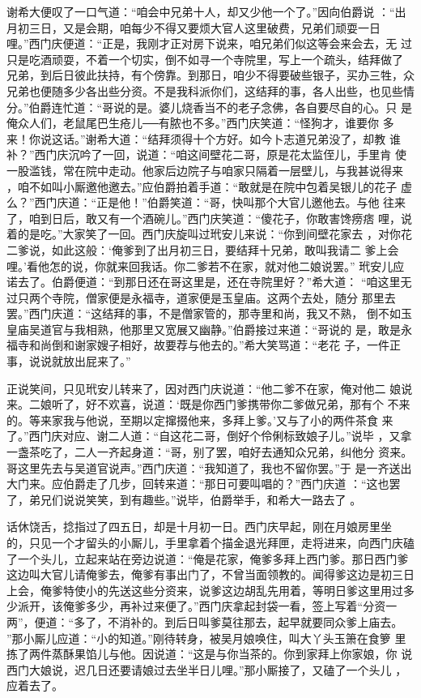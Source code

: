 谢希大便叹了一口气道：“咱会中兄弟十人，却又少他一个了。”因向伯爵说
：“出月初三日，又是会期，咱每少不得又要烦大官人这里破费，兄弟们顽耍一日
哩。”西门庆便道：“正是，我刚才正对房下说来，咱兄弟们似这等会来会去，无
过只是吃酒顽耍，不着一个切实，倒不如寻一个寺院里，写上一个疏头，结拜做了
兄弟，到后日彼此扶持，有个傍靠。到那日，咱少不得要破些银子，买办三牲，众
兄弟也便随多少各出些分资。不是我科派你们，这结拜的事，各人出些，也见些情
分。”伯爵连忙道：“哥说的是。婆儿烧香当不的老子念佛，各自要尽自的心。只
是俺众人们，老鼠尾巴生疮儿──有脓也不多。”西门庆笑道：“怪狗才，谁要你
多来！你说这话。”谢希大道：“结拜须得十个方好。如今卜志道兄弟没了，却教
谁补？”西门庆沉吟了一回，说道：“咱这间壁花二哥，原是花太监侄儿，手里肯
使一股滥钱，常在院中走动。他家后边院子与咱家只隔着一层壁儿，与我甚说得来
，咱不如叫小厮邀他邀去。”应伯爵拍着手道：“敢就是在院中包着吴银儿的花子
虚么？”西门庆道：“正是他！”伯爵笑道：“哥，快叫那个大官儿邀他去。与他
往来了，咱到日后，敢又有一个酒碗儿。”西门庆笑道：“傻花子，你敢害馋痨痞
哩，说着的是吃。”大家笑了一回。西门庆旋叫过玳安儿来说：“你到间壁花家去
，对你花二爹说，如此这般：‘俺爹到了出月初三日，要结拜十兄弟，敢叫我请二
爹上会哩。’看他怎的说，你就来回我话。你二爹若不在家，就对他二娘说罢。”
玳安儿应诺去了。伯爵便道：“到那日还在哥这里是，还在寺院里好？”希大道：
“咱这里无过只两个寺院，僧家便是永福寺，道家便是玉皇庙。这两个去处，随分
那里去罢。”西门庆道：“这结拜的事，不是僧家管的，那寺里和尚，我又不熟，
倒不如玉皇庙吴道官与我相熟，他那里又宽展又幽静。”伯爵接过来道：“哥说的
是，敢是永福寺和尚倒和谢家嫂子相好，故要荐与他去的。”希大笑骂道：“老花
子，一件正事，说说就放出屁来了。”

正说笑间，只见玳安儿转来了，因对西门庆说道：“他二爹不在家，俺对他二
娘说来。二娘听了，好不欢喜，说道：‘既是你西门爹携带你二爹做兄弟，那有个
不来的。等来家我与他说，至期以定撺掇他来，多拜上爹。’又与了小的两件茶食
来了。”西门庆对应、谢二人道：“自这花二哥，倒好个伶俐标致娘子儿。”说毕
，又拿一盏茶吃了，二人一齐起身道：“哥，别了罢，咱好去通知众兄弟，纠他分
资来。哥这里先去与吴道官说声。”西门庆道：“我知道了，我也不留你罢。”于
是一齐送出大门来。应伯爵走了几步，回转来道：“那日可要叫唱的？”西门庆道
：“这也罢了，弟兄们说说笑笑，到有趣些。”说毕，伯爵举手，和希大一路去了
。

话休饶舌，捻指过了四五日，却是十月初一日。西门庆早起，刚在月娘房里坐
的，只见一个才留头的小厮儿，手里拿着个描金退光拜匣，走将进来，向西门庆磕
了一个头儿，立起来站在旁边说道：“俺是花家，俺爹多拜上西门爹。那日西门爹
这边叫大官儿请俺爹去，俺爹有事出门了，不曾当面领教的。闻得爹这边是初三日
上会，俺爹特使小的先送这些分资来，说爹这边胡乱先用着，等明日爹这里用过多
少派开，该俺爹多少，再补过来便了。”西门庆拿起封袋一看，签上写着“分资一
两”，便道：“多了，不消补的。到后日叫爹莫往那去，起早就要同众爹上庙去。
”那小厮儿应道：“小的知道。”刚待转身，被吴月娘唤住，叫大丫头玉箫在食箩
里拣了两件蒸酥果馅儿与他。因说道：“这是与你当茶的。你到家拜上你家娘，你
说西门大娘说，迟几日还要请娘过去坐半日儿哩。”那小厮接了，又磕了一个头儿
，应着去了。

